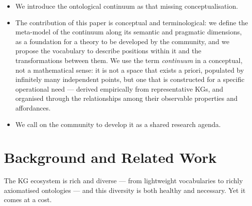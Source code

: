 \documentclass[runningheads]{llncs}
\begin{document}
\begin{itemize}
	\item We introduce the ontological continuum as that missing conceptualisation.
	\item The contribution of this paper is conceptual and terminological: we define the meta-model of the continuum along its semantic and pragmatic dimensions, as a foundation for a theory to be developed by the community, and we propose the vocabulary to describe positions within it and the transformations between them. We use the term \emph{continuum} in a conceptual, not a mathematical sense: it is not a space that exists a priori, populated by infinitely many independent points, but one that is constructed for a specific operational need --- derived empirically from representative KGs, and organised through the relationships among their observable properties and affordances. %
    \item We call on the community to develop it as a shared research agenda.
\end{itemize}

\section{Background and Related Work}
\label{sec:background}

The KG ecosystem is rich and diverse --- from lightweight vocabularies to richly axiomatised ontologies --- and this diversity is both healthy and necessary. Yet it comes at a cost.
\end{document}

